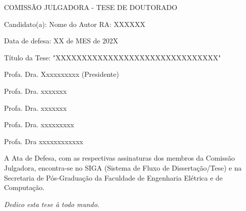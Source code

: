 
%
% 
%
\begin{folhadeaprovacao}

  \begin{center}
    COMISS\~{A}O JULGADORA - TESE DE DOUTORADO
\end{center}
\noindent
\begin{minipage}{\textwidth}\SingleSpacing
Candidato(a): Nome do Autor      RA: XXXXXX

Data de defesa: XX de MES de 202X

T\'{i}tulo da Tese: "XXXXXXXXXXXXXXXXXXXXXXXXXXXXXXX"
\vspace{2cm}

Profa. Dra. Xxxxxxxxxx (Presidente)

Profa. Dra. xxxxxxx

Profa. Dra. xxxxxxx

Profa. Dra. xxxxxxxxx

Profa. Dra xxxxxxxxxxxx

\vspace{2cm}

A Ata de Defesa, com as respectivas assinaturas dos membros da Comiss\~{a}o Julgadora, encontra-se no SIGA (Sistema de Fluxo de Disserta\c{c}\~{a}o/Tese) e na Secretaria de P\'{o}s-Gradua\c{c}\~{a}o da Faculdade de Engenharia El\'{e}trica e de Computa\c{c}\~{a}o.
\end{minipage}

\end{folhadeaprovacao}

\begin{dedicatoria}
   \vspace*{\fill}
   \centering
   \noindent
   \textit{ Dedico esta tese \`{a} todo mundo.} \vspace*{\fill}
\end{dedicatoria}

